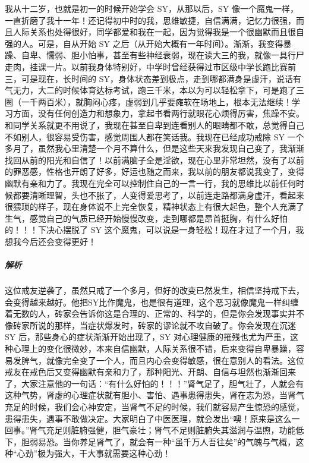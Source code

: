 \begin{case}
    我从十二岁，也就是初一的时候开始学会 SY，从那以后，SY 像一个魔鬼一样，一直折磨了我十一年！还记得初中时的我，思维敏捷，自信满满，记忆力很强，而且人际关系也处得很好，同学都爱和我在一起，因为觉得我是一个很幽默而且很自强的人。可是，自从开始 SY 之后（从开始大概有一年时间）。渐渐，我变得暴躁、自卑、懦弱、胆小怕事，甚至有些神经衰弱，现在读大三的我，就像一具行尸走肉，挂课一片。以前我身体特别好，中学时曾经获得过市区级中学长跑比赛前三，可是现在，长时间的 SY，身体状态差到极点，走到哪都满身是虚汗，说话有气无力，大二的时候体育达标考试，跑三千米，本以为可以轻松拿下，可是跑了三圈（一千两百米），就胸闷心疼，虚弱到几乎要瘫软在场地上，根本无法继续！学习方面，没有任何创造力和想象力，拿起书看两行就眼花心烦得厉害，焦躁不安。和同学关系就更不用说了，我现在甚至自卑到连看别人的眼睛都不敢，总觉得自己不如别人，很容易受伤害，感觉周围人都在笑话我。我现在已经成功戒除 SY 一个多月了，虽然我心里清楚一个月不算什么，但是这些天来我发现自己变了，我渐渐找回从前的阳光和自信了！以前满脑子全是淫欲，现在心里非常坦然，没有了以前的罪恶感，性格也开朗了好多，好运也随之而来，我以前的朋友都说我变了，变得幽默有亲和力了。我现在完全可以控制住自己的一言一行，我的思维比以前任何时候都要清晰理智，头也不胀了，人变得爱思考了，以前连走路都满身虚汗，看起来很猥琐的样子，现在身体说不上完全恢复，精神状态上有很大起色，整个人充满了生气，感觉自己的气质已经开始慢慢改变，走到哪都是昂首挺胸，有什么好怕的！！！下决心摆脱了 SY 这个魔鬼，可以说是一身轻松！现在才过了一个月，我想我今后还会变得更好！
    \subparagraph{解析} 这位戒友逆袭了，虽然只戒了一个多月，但好的改变已然发生，相信坚持戒下去，会变得越来越好。他把SY比作魔鬼，也是很有道理，这个恶习就像魔鬼一样纠缠着无数的人，砖家会告诉你这是合理的、正常的、科学的，但是你会发现事实并不像砖家所说的那样，当症状爆发时，砖家的谬论就不攻自破了。你会发现在沉迷 SY 后，那些身心的症状渐渐开始出现了，SY 对心理健康的摧残也尤为严重，这种心理上的变化很微妙，本来自信幽默，人际关系很不错，后来变得自卑暴躁，容易发脾气，就像完全变了一个人，而且内心会变得敏感，很在意别人的看法。这位戒友在戒色后又变得幽默有亲和力了，那种阳光、开朗、自信与坦然也渐渐回来了，大家注意他的一句话：“有什么好怕的！！！”肾气足了，胆气壮了，人就会有这种气势，肾虚的心理症状就有胆小、害怕、遇事患得患失，肾在志为恐，当肾气充足的时候，我们会心神安定，当肾气不足的时候，我们就容易产生惊恐的感觉，患得患失，遇事不敢做决定。大家明白了中医医理，就会发出“噢！原来是这么一回事。”肾气充足则脏腑强健，胆气豪壮；肾气不足则脏腑失其滋润与温煦，功能低下，胆弱易恐。当你养足肾气了，就会有一种“虽千万人吾往矣”的气魄与气概，这种“心劲”极为强大，干大事就需要这种心劲！
\end{case}

